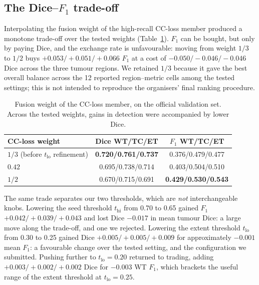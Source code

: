 \documentclass[runningheads]{llncs}
\begin{document}
\subsection{The Dice--$F_1$ trade-off}
\label{sec:frontier}

Interpolating the fusion weight of the high-recall CC-loss member produced a monotone trade-off
over the tested weights
(Table~\ref{tab:frontier}). $F_1$ can be bought, but only by paying Dice, and the exchange rate is
unfavourable: moving from weight $1/3$ to $1/2$ buys $+0.053/+0.051/+0.066$ $F_1$ at a cost of
$-0.050/-0.046/-0.046$ Dice across the three tumour regions. We retained $1/3$ because it gave the best overall balance
across the 12 reported region--metric cells among the tested settings; this is not intended to
reproduce the organisers' final ranking procedure.

\begin{table}[t]
\centering
\caption{Fusion weight of the CC-loss member, on the official validation set. Across the tested weights, gains in detection were accompanied by lower Dice.}
\label{tab:frontier}
\begin{tabular}{@{}lcc@{}}
\toprule
CC-loss weight & Dice WT/TC/ET & $F_1$ WT/TC/ET \\
\midrule
$1/3$ (before $t_{\mathrm{lo}}$ refinement) & \textbf{0.720/0.761/0.737} & 0.376/0.479/0.477 \\
$0.42$            & 0.695/0.738/0.714 & 0.403/0.504/0.510 \\
$1/2$             & 0.670/0.715/0.691 & \textbf{0.429/0.530/0.543} \\
\bottomrule
\end{tabular}
\end{table}

The same trade separates our two thresholds, which are \emph{not} interchangeable knobs. Lowering
the seed threshold $t_{\mathrm{hi}}$ from 0.70 to 0.65 gained $F_1$ $+0.042/+0.039/+0.043$ and lost Dice
$-0.017$ in mean tumour Dice: a large move along the trade-off, and one we rejected. Lowering the extent threshold
$t_{\mathrm{lo}}$ from 0.30 to 0.25 gained Dice $+0.005/+0.005/+0.009$ for approximately $-0.001$ mean $F_1$: a favourable change over the tested setting, and the configuration we submitted. Pushing further to
$t_{\mathrm{lo}}=0.20$ returned to trading, adding $+0.003/+0.002/+0.002$ Dice for $-0.003$ WT $F_1$, which brackets the useful range of the extent threshold at $t_{\mathrm{lo}}=0.25$.

\end{document}
